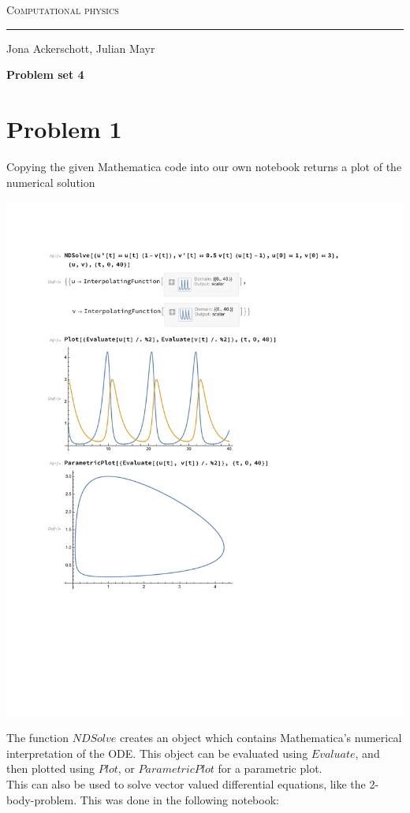 \documentclass[12pt, a4paper]{article}
\begin{document}
  \centerline{\Huge\scshape Computational physics}
  \vspace*{0.5cm}
  \hrule
  \vspace*{0.5cm}
  \centerline{Jona Ackerschott, Julian Mayr}
  \vspace*{1cm}
  \centerline{\Large\bfseries Problem set 4}
  \vspace*{0.5cm}

  \section*{Problem 1}
  Copying the given Mathematica code into our own notebook returns a plot of the numerical solution
  
  \includegraphics[scale=0.6,page=1]{nb1.pdf}
  
  The function $NDSolve$ creates an object which contains Mathematica's numerical interpretation of the ODE. This object can be evaluated using $Evaluate$, and then plotted using $Plot$, or $ParametricPlot$ for a parametric plot.
\\This can also be used to solve vector valued differential equations, like the 2-body-problem. This was done in the following notebook:
\end{document}
